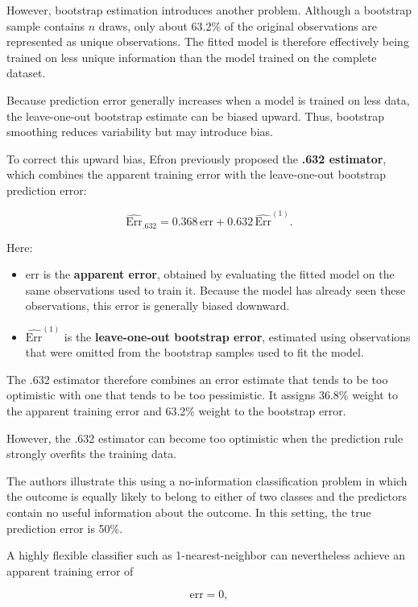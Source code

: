 \documentclass[
  letterpaper,
  DIV=11,
  numbers=noendperiod]{scrreprt}
\providecommand{\tightlist}{%
  \setlength{\itemsep}{0pt}\setlength{\parskip}{0pt}}
\begin{document}
However, bootstrap estimation introduces another problem. Although a
bootstrap sample contains \(n\) draws, only about 63.2\% of the original
observations are represented as unique observations. The fitted model is
therefore effectively being trained on less unique information than the
model trained on the complete dataset.

Because prediction error generally increases when a model is trained on
less data, the leave-one-out bootstrap estimate can be biased upward.
Thus, bootstrap smoothing reduces variability but may introduce bias.

To correct this upward bias, Efron previously proposed the \textbf{.632
estimator}, which combines the apparent training error with the
leave-one-out bootstrap prediction error:

\[
\widehat{\mathrm{Err}}_{.632}
=
0.368\,\mathrm{err}
+
0.632\,\widehat{\mathrm{Err}}^{(1)}.
\]

Here:

\begin{itemize}
\tightlist
\item
  \(\mathrm{err}\) is the \textbf{apparent error}, obtained by
  evaluating the fitted model on the same observations used to train it.
  Because the model has already seen these observations, this error is
  generally biased downward.
\item
  \(\widehat{\mathrm{Err}}^{(1)}\) is the \textbf{leave-one-out
  bootstrap error}, estimated using observations that were omitted from
  the bootstrap samples used to fit the model.
\end{itemize}

The .632 estimator therefore combines an error estimate that tends to be
too optimistic with one that tends to be too pessimistic. It assigns
36.8\% weight to the apparent training error and 63.2\% weight to the
bootstrap error.

However, the .632 estimator can become too optimistic when the
prediction rule strongly overfits the training data.

The authors illustrate this using a no-information classification
problem in which the outcome is equally likely to belong to either of
two classes and the predictors contain no useful information about the
outcome. In this setting, the true prediction error is 50\%.

A highly flexible classifier such as 1-nearest-neighbor can nevertheless
achieve an apparent training error of

\[
\mathrm{err}=0,
\]
\end{document}
